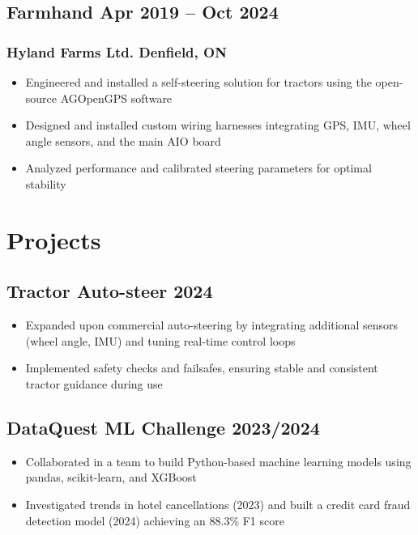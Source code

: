 \documentclass[11pt]{article}
\begin{document}
\subsection{Farmhand \hfill Apr 2019 -- Oct 2024}
\subsubsection{Hyland Farms Ltd. \hfill Denfield, ON}
\begin{itemize}[left=0pt..1em]
  \item Engineered and installed a self-steering solution for tractors using the open-source AGOpenGPS software
  \item Designed and installed custom wiring harnesses integrating GPS, IMU, wheel angle sensors, and the main AIO board
  \item Analyzed performance and calibrated steering parameters for optimal stability
\end{itemize}

\section{Projects}

\subsection{Tractor Auto-steer \hfill 2024}
\begin{itemize}[left=0pt..1em]
  \item Expanded upon commercial auto-steering by integrating additional sensors (wheel angle, IMU) and tuning real-time control loops
  \item Implemented safety checks and failsafes, ensuring stable and consistent tractor guidance during use
\end{itemize}

\subsection{DataQuest ML Challenge \hfill 2023/2024}
\begin{itemize}[left=0pt..1em]
  \item Collaborated in a team to build Python-based machine learning models using pandas, scikit-learn, and XGBoost
  \item Investigated trends in hotel cancellations (2023) and built a credit card fraud detection model (2024) achieving an 88.3\% F1 score
\end{itemize}
\end{document}
